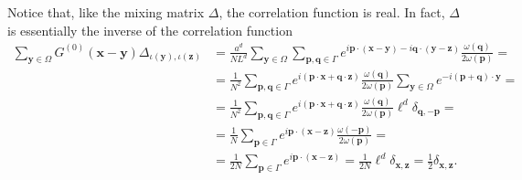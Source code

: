 \documentclass[a4paper,10pt]{report}
\begin{document}
Notice that, like the mixing matrix $\Delta$, the correlation function is real. In fact,  $\Delta$ is essentially the inverse of the correlation function
\begin{align}
\sum_{\mathbf{y}\in\Omega}G^{(0)}(\mathbf{x}-\mathbf{y})\Delta_{\iota(\mathbf{y}),\iota(\mathbf{z})} &= \frac{a^d}{NL^d}\sum_{\mathbf{y}\in\Omega}\sum_{\mathbf{p},\mathbf{q}\in\Gamma}e^{i\mathbf{p}\cdot(\mathbf{x}-\mathbf{y})-i\mathbf{q}\cdot(\mathbf{y}-\mathbf{z})}\frac{\omega(\mathbf{q})}{2\omega(\mathbf{p})} = \nonumber\\
&=\frac{1}{N^2}\sum_{\mathbf{p},\mathbf{q}\in\Gamma}e^{i(\mathbf{p}\cdot\mathbf{x}+\mathbf{q}\cdot\mathbf{z})}\frac{\omega(\mathbf{q})}{2\omega(\mathbf{p})}\sum_{\mathbf{y}\in\Omega}e^{-i(\mathbf{p}+\mathbf{q})\cdot\mathbf{y}} = \nonumber\\
&= \frac{1}{N^2}\sum_{\mathbf{p},\mathbf{q}\in\Gamma}e^{i(\mathbf{p}\cdot\mathbf{x}+\mathbf{q}\cdot\mathbf{z})}\frac{\omega(\mathbf{q})}{2\omega(\mathbf{p})}\ell^d\delta_{\mathbf{q},-\mathbf{p}} = 
\nonumber\\
&=\frac{1}{N}\sum_{\mathbf{p}\in\Gamma}e^{i\mathbf{p}\cdot(\mathbf{x}-\mathbf{z})}\frac{\omega(-\mathbf{p})}{2\omega(\mathbf{p})} = \nonumber\\
&=\frac{1}{2N}\sum_{\mathbf{p}\in\Gamma}e^{i\mathbf{p}\cdot(\mathbf{x}-\mathbf{z})} = \frac{1}{2N}\ell^{d}\delta_{\mathbf{x},\mathbf{z}} = \frac{1}{2}\delta_{\mathbf{x},\mathbf{z}}.
\end{align}
\end{document}
